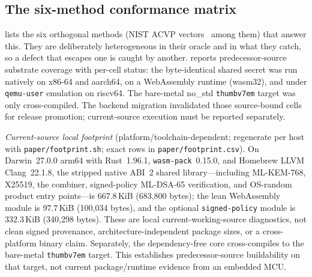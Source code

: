 \documentclass[journal]{IEEEtran}
\newcommand{\code}[1]{\texttt{\small #1}}
\begin{document}
\subsection{The six-method conformance matrix}

 lists the six orthogonal methods (NIST ACVP vectors~\cite{acvp} among them) that answer this. They are deliberately
heterogeneous in their oracle and in what they catch, so a defect that escapes one is caught by
another.  reports predecessor-source substrate coverage with per-cell status:
the byte-identical shared secret was run natively on x86-64 and aarch64, on a WebAssembly runtime
(wasm32), and under \code{qemu-user} emulation on riscv64. The bare-metal no\_std
\code{thumbv7em} target was only cross-compiled. The backend migration invalidated those
source-bound cells for release promotion; current-source execution must be reported separately.

\emph{Current-source local footprint} (platform/toolchain-dependent; regenerate per
host with \code{paper/footprint.sh}; exact rows in \code{paper/footprint.csv}). On
Darwin~27.0.0 arm64 with Rust~1.96.1, \code{wasm-pack}~0.15.0, and Homebrew LLVM
Clang~22.1.8, the stripped native ABI~2 shared library---including
ML-KEM-768, X25519, the combiner, signed-policy ML-DSA-65 verification, and OS-random
product entry points---is $667.8$\,KiB (683{,}800 bytes); the lean WebAssembly module is
$97.7$\,KiB (100{,}034 bytes), and the optional \code{signed-policy} module is
$332.3$\,KiB (340{,}298 bytes). These are local current-working-source diagnostics,
not clean signed provenance, architecture-independent package sizes, or a cross-platform
binary claim. Separately,
the dependency-free core cross-compiles to the bare-metal \code{thumbv7em} target. This establishes
predecessor-source buildability on that target, not current package/runtime evidence from an embedded MCU.
\end{document}
